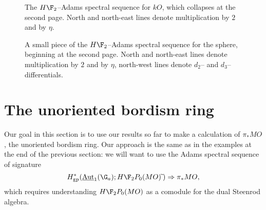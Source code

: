 \begin{sidewaysfigure}
\centering

\caption{The $H\F_2$--Adams spectral sequence for $kO$, which collapses at the second page.  North and north-east lines denote multiplication by $2$ and by $\eta$.}\label{kOASSFigure}
\end{sidewaysfigure}
\begin{sidewaysfigure}
\centering

\caption{A small piece of the $H\F_2$--Adams spectral sequence for the sphere, beginning at the second page.  North and north-east lines denote multiplication by $2$ and by $\eta$, north-west lines denote $d_2$-- and $d_3$--differentials.}\label{HF2ASSFigure}
\end{sidewaysfigure}











\section{The unoriented bordism ring}\label{PiStarMOSection}

Our goal in this section is to use our results so far to make a calculation of $\pi_* MO$, the unoriented bordism ring.  Our approach is the same as in the examples at the end of the previous section: we will want to use the Adams spectral sequence of signature \[H^*_{\mathrm{gp}}(\InternalAut_1(\G_a); H\F_2P_0(MO)\widetilde{\:}) \Rightarrow \pi_* MO,\] which requires understanding $H\F_2P_0(MO)$ as a comodule for the dual Steenrod algebra.

